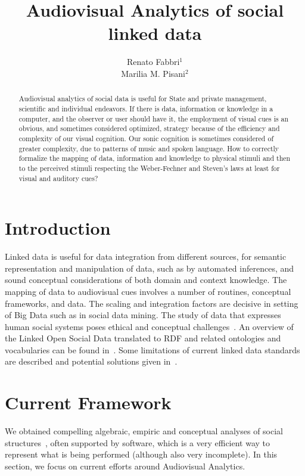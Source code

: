 \documentclass[letterpaper,10pt]{article}
\begin{document}
\title{Audiovisual Analytics of social linked data}

\author{Renato Fabbri$^1$\\
	Marilia M. Pisani$^2$
}
\address{$^1$IFSC/USP, $^2$CCNH/UFABC}

\begin{abstract}
	Audiovisual analytics of social data is useful for State and private
	management, scientific and individual endeavors.
	If there is data, information or knowledge in a computer,
	and the observer or user should have it, the employment of visual cues is an obvious,
	and sometimes considered optimized, strategy because of the efficiency and
	complexity of our visual cognition.
	Our sonic cognition is sometimes considered of greater complexity,
	due to patterns of music and spoken language.
	How to correctly formalize the mapping of data, information
	and knowledge to physical stimuli
	and then to the perceived stimuli
	respecting the Weber-Fechner and Steven's laws at least for visual
	and auditory cues?
\end{abstract}

\section{Introduction}
Linked data is useful for data integration from different sources,
for semantic representation and manipulation of data,
such as by automated inferences,
and sound conceptual considerations of both domain and context
knowledge.
The mapping of data to audiovisual cues
involves a number of routines, conceptual frameworks,
and data.
The scaling and integration factors are decisive in setting
of Big Data such as in social data mining.
The study of data that expresses human social systems
poses ethical and conceptual challenges~\cite{an,an2}.
An overview of the Linked Open Social Data translated to
RDF and related ontologies and vocabularies
can be found in~\cite{nuvem1,tese,losd}.
Some limitations of current linked data standards
are described and potential solutions given in~\cite{ont}.

\section{Current Framework}\label{current}
We obtained compelling algebraic, empiric and conceptual
analyses of social structures~\cite{tese,stab},
often supported by software, which is a very efficient
way to represent
what is being performed (although also very incomplete).
In this section, we focus on current efforts around Audiovisual Analytics.
\end{document}
